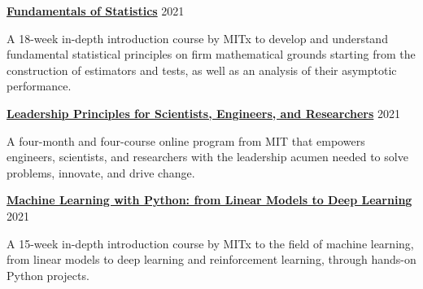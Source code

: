 \documentclass[margin,line]{res}
\begin{document}
\begin{resume}
%

{\bf \href{https://www.edx.org/course/fundamentals-of-statistics}{Fundamentals of Statistics}} \hfill {2021}\\
\vspace*{-3.5mm}
\begin{addmargin}[0pt]{.1\linewidth}
\vspace*{-1mm}
A 18-week in-depth introduction course by MITx to develop and understand fundamental statistical principles on firm mathematical grounds starting from the construction of estimators and tests, as well as an analysis of their asymptotic performance.
\end{addmargin}

\vspace*{-2mm}

{\bf \href{https://xpro.mit.edu/programs/program-v1:xPRO+LASERx/}{Leadership Principles for Scientists, Engineers, and Researchers}} \hfill {2021}\\
\vspace*{-3.5mm}
\begin{addmargin}[0pt]{.1\linewidth}
\vspace*{-1mm}
A four-month and four-course online program from MIT that empowers engineers, scientists, and researchers with the leadership acumen needed to solve problems, innovate, and drive change.
\end{addmargin}

\vspace*{-2mm}

{\bf \href{https://www.edx.org/course/machine-learning-with-python-from-linear-models-to}{Machine Learning with Python: from Linear Models to Deep Learning}} \hfill {2021}\\
\vspace*{-3.5mm}
\begin{addmargin}[0pt]{.1\linewidth}
\vspace*{-1mm}
A 15-week in-depth introduction course by MITx to the field of machine learning, from linear models to deep learning and reinforcement learning, through hands-on Python projects.
\end{addmargin}


\end{resume}
\end{document}
